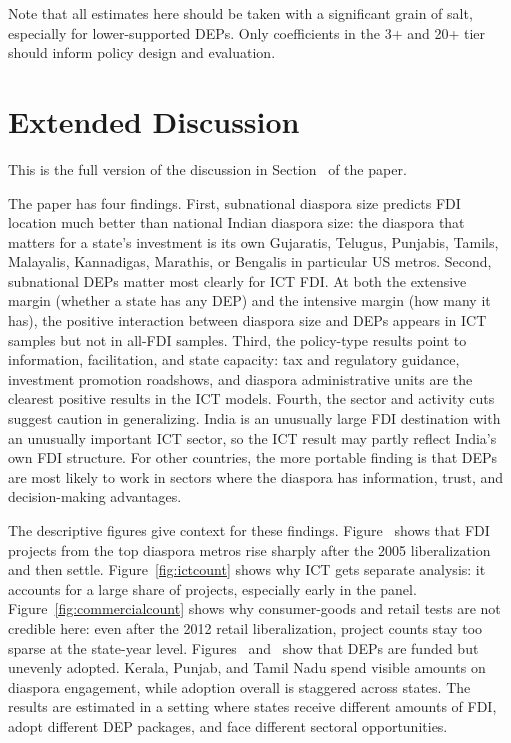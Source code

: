 \documentclass[12pt]{article}
\let\oldsection\section
\renewcommand{\section}{\FloatBarrier\oldsection}
\begin{document}
Note that all estimates here should be taken with a significant grain of salt, especially for lower-supported DEPs. Only coefficients in the 3+ and 20+ tier should inform policy design and evaluation.

\begingroup
\footnotesize
{}


\endgroup

\section{Extended Discussion} \label{sec:oa_discussion}

This is the full version of the discussion in Section~ of the paper.

The paper has four findings. First, subnational diaspora size predicts FDI location much better than national Indian diaspora size: the diaspora that matters for a state's investment is its own Gujaratis, Telugus, Punjabis, Tamils, Malayalis, Kannadigas, Marathis, or Bengalis in particular US metros. Second, subnational DEPs matter most clearly for ICT FDI. At both the extensive margin (whether a state has any DEP) and the intensive margin (how many it has), the positive interaction between diaspora size and DEPs appears in ICT samples but not in all-FDI samples. Third, the policy-type results point to information, facilitation, and state capacity: tax and regulatory guidance, investment promotion roadshows, and diaspora administrative units are the clearest positive results in the ICT models. Fourth, the sector and activity cuts suggest caution in generalizing. India is an unusually large FDI destination with an unusually important ICT sector, so the ICT result may partly reflect India's own FDI structure. For other countries, the more portable finding is that DEPs are most likely to work in sectors where the diaspora has information, trust, and decision-making advantages.

The descriptive figures give context for these findings. Figure~ shows that FDI projects from the top diaspora metros rise sharply after the 2005 liberalization and then settle. Figure~\ref{fig:ictcount} shows why ICT gets separate analysis: it accounts for a large share of projects, especially early in the panel. Figure~\ref{fig:commercialcount} shows why consumer-goods and retail tests are not credible here: even after the 2012 retail liberalization, project counts stay too sparse at the state-year level. Figures~ and~ show that DEPs are funded but unevenly adopted. Kerala, Punjab, and Tamil Nadu spend visible amounts on diaspora engagement, while adoption overall is staggered across states. The results are estimated in a setting where states receive different amounts of FDI, adopt different DEP packages, and face different sectoral opportunities.
\end{document}
